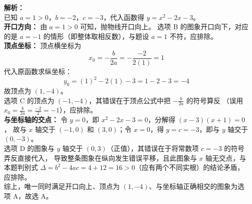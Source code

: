 \documentclass[12pt,a4paper]{exam-zh}
\begin{document}
\begin{question}
\begin{choices}
        \item
    \end{choices}
\end{question}

\begin{solution}
    \textbf{解析：} \\
    已知 $a = 1 > 0$，$b = -2$，$c = -3$，代入函数得 $y = x^2 - 2x - 3$。 \\[4pt]
    \textbf{开口方向：} 由 $a = 1 > 0$ 可知，抛物线开口向上。
    选项 B 的图象开口向下，对应的是 $a = -1$ 的情形（即整体取相反数），与题设 $a=1$ 不符，应排除。 \\[4pt]
    \textbf{顶点坐标：} 顶点横坐标为
    \[ \displaystyle x_0 = -\frac{b}{2a} = -\frac{-2}{2(1)} = 1 \]
    代入原函数求纵坐标：
    \[ \displaystyle y_0 = (1)^2 - 2(1) - 3 = 1 - 2 - 3 = -4 \]
    故顶点为 $(1, -4)$。 \\
    选项 C 的顶点为 $(-1, -4)$，其错误在于顶点公式中把 $-\frac{b}{2a}$ 的符号算反
    （误用 $x_0 = \frac{b}{2a} = \frac{-2}{2} = -1$），应排除。 \\[4pt]
    \textbf{与坐标轴的交点：} 令 $y=0$，即 $x^2-2x-3=0$，分解得 $(x-3)(x+1)=0$，
    故与 $x$ 轴交于 $(-1,0)$ 和 $(3,0)$；令 $x=0$，得 $y=c=-3$，即与 $y$ 轴交于 $(0,-3)$。 \\
    选项 D 的图象与 $y$ 轴交于 $(0,3)$（正值），其错误在于将常数项 $c=-3$ 的符号弄反直接代入，
    导致整条图象在纵向发生错误平移，且此图象与 $x$ 轴无交点，与本题判别式
    $\Delta = b^2-4ac = 4+12=16>0$（应有两个不同实根）的结论矛盾，应排除。 \\[4pt]
    综上，唯一同时满足开口向上、顶点为 $(1,-4)$、与坐标轴正确相交的图象为选项 A，故选 A。
\end{solution}
\end{document}

